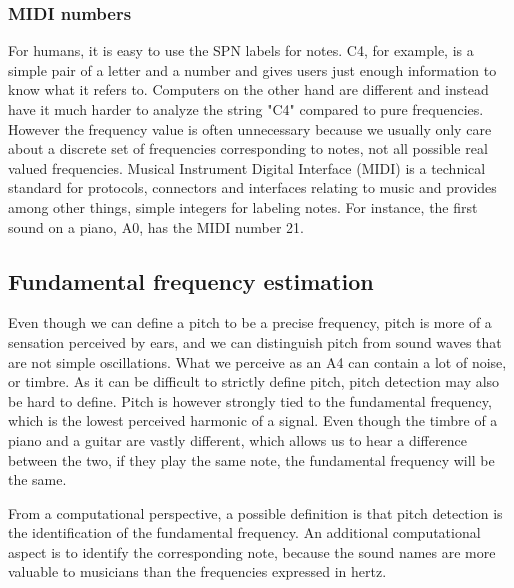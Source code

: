 \subsubsection{MIDI numbers}
For humans, it is easy to use the SPN labels for notes. C4, for example, is a simple pair of a letter and a number and gives users just enough information to know what it refers to. Computers on the other hand are different and instead have it much harder to analyze the string "C4" compared to pure frequencies. However the frequency value is often unnecessary because we usually only care about a discrete set of frequencies corresponding to notes, not all possible real valued frequencies. Musical Instrument Digital Interface (MIDI) is a technical standard for protocols, connectors and interfaces relating to music and provides among other things, simple integers for labeling notes. For instance, the first sound on a piano, A0, has the MIDI number 21. 


% 
\subsection{Fundamental frequency estimation}
Even though we can define a pitch to be a precise frequency, pitch is more of a sensation perceived by ears, and we can distinguish pitch from sound waves that are not simple oscillations. What we perceive as an A4 can contain a lot of noise, or timbre. As it can be difficult to strictly define pitch, pitch detection may also be hard to define. Pitch is however strongly tied to the fundamental frequency, which is the lowest perceived harmonic of a signal. Even though the timbre of a piano and a guitar are vastly different, which allows us to hear a difference between the two, if they play the same note, the fundamental frequency will be the same. 

From a computational perspective, a possible definition is that pitch detection is the identification of the fundamental frequency. An additional computational aspect is to identify the corresponding note, because the sound names are more valuable to musicians than the frequencies expressed in hertz. 

